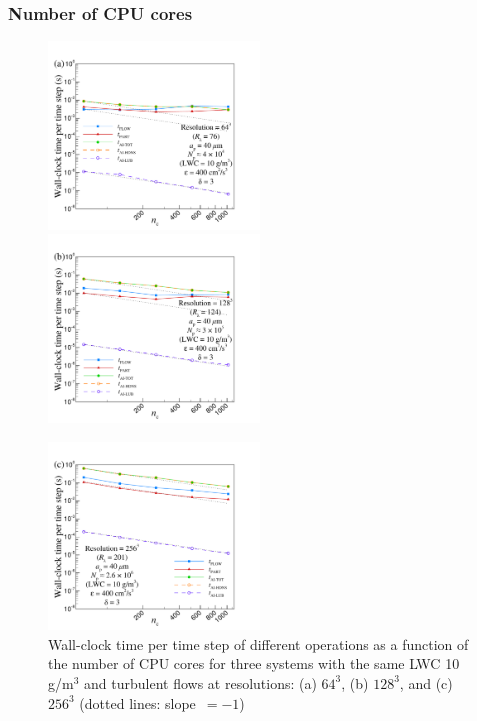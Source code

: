 \documentclass[../thesis.tex]{subfiles}
\begin{document}
\subsubsection{Number of CPU cores}

\begin{figure}%
\includegraphics[trim=5mm 0mm 20mm 15mm, clip, width=0.5\textwidth]{./figs/PPAM/6a/CP022_fig6a.pdf}
\includegraphics[trim=5mm 0mm 20mm 15mm, clip, width=0.5\textwidth]{./figs/PPAM/6b/CP022_fig6b.pdf}
\centerline{\includegraphics[trim=5mm 0mm 20mm 15mm, clip, width=0.5\textwidth]{./figs/PPAM/6c/CP022_fig6c.pdf}}
\caption{Wall-clock time per time step of different operations as a function of the number of CPU cores for three systems with the same LWC 10 g/m$^3$ and turbulent flows at resolutions: (a) $64^3$, (b) $128^3$, and (c) $256^3$ (dotted lines: \mbox{slope $=-1$)}}
\label{nproc}
\end{figure}%
\end{document}
